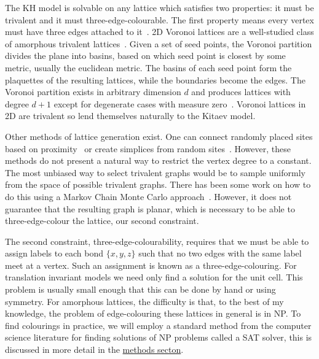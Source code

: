 The KH model is solvable on any lattice which satisfies two properties: it must be trivalent and it must three-edge-colourable. The first property means every vertex must have three edges attached to it~\autocite{kitaevAnyonsExactlySolved2006,Nussinov2009}. 2D Voronoi lattices are a well-studied class of amorphous trivalent lattices~\autocite{mitchellAmorphousTopologicalInsulators2018,florescu_designer_2009,marsalTopologicalWeaireThorpeModels2020}. Given a set of seed points, the Voronoi partition divides the plane into basins, based on which seed point is closest by some metric, usually the euclidean metric. The basins of each seed point form the plaquettes of the resulting lattices, while the boundaries become the edges. The Voronoi partition exists in arbitrary dimension \(d\) and produces lattices with degree \(d+1\) except for degenerate cases with measure zero~\autocite{voronoiNouvellesApplicationsParamètres1908,watsonComputingNdimensionalDelaunay1981}. Voronoi lattices in 2D are trivalent so lend themselves naturally to the Kitaev model.

Other methods of lattice generation exist. One can connect randomly placed sites based on proximity~\autocite{agarwala2019topological} or create simplices from random sites~\autocite{christRandomLatticeField1982}. However, these methods do not present a natural way to restrict the vertex degree to a constant. The most unbiased way to select trivalent graphs would be to sample uniformly from the space of possible trivalent graphs. There has been some work on how to do this using a Markov Chain Monte Carlo approach~\autocite{alyamiUniformSamplingDirected2016}. However, it does not guarantee that the resulting graph is planar, which is necessary to be able to three-edge-colour the lattice, our second constraint.

The second constraint, three-edge-colourability, requires that we must be able to assign labels to each bond \(\{x,y,z\}\) such that no two edges with the same label meet at a vertex. Such an assignment is known as a three-edge-colouring. For translation invariant models we need only find a solution for the unit cell. This problem is usually small enough that this can be done by hand or using symmetry. For amorphous lattices, the difficulty is that, to the best of my knowledge, the problem of edge-colouring these lattices in general is in NP. To find colourings in practice, we will employ a standard method from the computer science literature for finding solutions of NP problems called a SAT solver, this is discussed in more detail in the \protect\hyperlink{amk-methods}{methods secton}.

